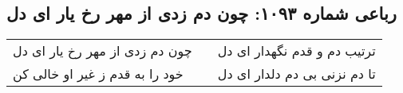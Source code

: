 \begin{center}
\section*{رباعی شماره ۱۰۹۳: چون دم زدی از مهر رخ یار ای دل}
\label{sec:1093}
\begin{longtable}{l p{0.5cm} r}
چون دم زدی از مهر رخ یار ای دل
&&
ترتیب دم و قدم نگهدار ای دل
\\
خود را به قدم ز غیر او خالی کن
&&
تا دم نزنی بی دم دلدار ای دل
\\
\end{longtable}
\end{center}
